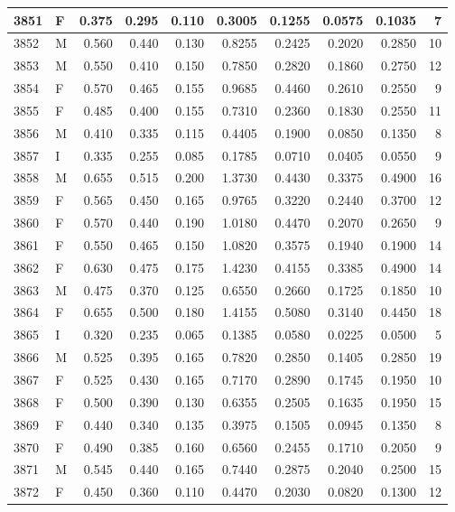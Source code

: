 \documentclass[9pt,twocolumn,twoside,]{pnas-new}
\begin{document}
\begin{tabular}{l|l|r|r|r|r|r|r|r|r}
\hline
3851 & F & 0.375 & 0.295 & 0.110 & 0.3005 & 0.1255 & 0.0575 & 0.1035 & 7\\
\hline
3852 & M & 0.560 & 0.440 & 0.130 & 0.8255 & 0.2425 & 0.2020 & 0.2850 & 10\\
\hline
3853 & M & 0.550 & 0.410 & 0.150 & 0.7850 & 0.2820 & 0.1860 & 0.2750 & 12\\
\hline
3854 & F & 0.570 & 0.465 & 0.155 & 0.9685 & 0.4460 & 0.2610 & 0.2550 & 9\\
\hline
3855 & F & 0.485 & 0.400 & 0.155 & 0.7310 & 0.2360 & 0.1830 & 0.2550 & 11\\
\hline
3856 & M & 0.410 & 0.335 & 0.115 & 0.4405 & 0.1900 & 0.0850 & 0.1350 & 8\\
\hline
3857 & I & 0.335 & 0.255 & 0.085 & 0.1785 & 0.0710 & 0.0405 & 0.0550 & 9\\
\hline
3858 & M & 0.655 & 0.515 & 0.200 & 1.3730 & 0.4430 & 0.3375 & 0.4900 & 16\\
\hline
3859 & F & 0.565 & 0.450 & 0.165 & 0.9765 & 0.3220 & 0.2440 & 0.3700 & 12\\
\hline
3860 & F & 0.570 & 0.440 & 0.190 & 1.0180 & 0.4470 & 0.2070 & 0.2650 & 9\\
\hline
3861 & F & 0.550 & 0.465 & 0.150 & 1.0820 & 0.3575 & 0.1940 & 0.1900 & 14\\
\hline
3862 & F & 0.630 & 0.475 & 0.175 & 1.4230 & 0.4155 & 0.3385 & 0.4900 & 14\\
\hline
3863 & M & 0.475 & 0.370 & 0.125 & 0.6550 & 0.2660 & 0.1725 & 0.1850 & 10\\
\hline
3864 & F & 0.655 & 0.500 & 0.180 & 1.4155 & 0.5080 & 0.3140 & 0.4450 & 18\\
\hline
3865 & I & 0.320 & 0.235 & 0.065 & 0.1385 & 0.0580 & 0.0225 & 0.0500 & 5\\
\hline
3866 & M & 0.525 & 0.395 & 0.165 & 0.7820 & 0.2850 & 0.1405 & 0.2850 & 19\\
\hline
3867 & F & 0.525 & 0.430 & 0.165 & 0.7170 & 0.2890 & 0.1745 & 0.1950 & 10\\
\hline
3868 & F & 0.500 & 0.390 & 0.130 & 0.6355 & 0.2505 & 0.1635 & 0.1950 & 15\\
\hline
3869 & F & 0.440 & 0.340 & 0.135 & 0.3975 & 0.1505 & 0.0945 & 0.1350 & 8\\
\hline
3870 & F & 0.490 & 0.385 & 0.160 & 0.6560 & 0.2455 & 0.1710 & 0.2050 & 9\\
\hline
3871 & M & 0.545 & 0.440 & 0.165 & 0.7440 & 0.2875 & 0.2040 & 0.2500 & 15\\
\hline
3872 & F & 0.450 & 0.360 & 0.110 & 0.4470 & 0.2030 & 0.0820 & 0.1300 & 12\\

\end{tabular}
\end{document}
